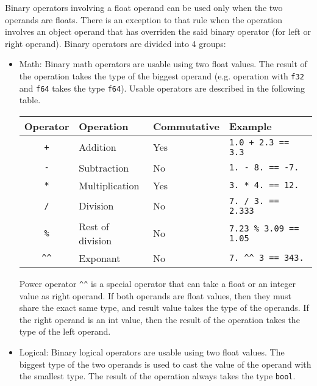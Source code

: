 Binary operators involving a float operand can be used only when the two
operands are floats. There is an exception to that rule when the operation
involves an object operand that has overriden the said binary operator (for left
or right operand). Binary operators are divided into 4 groups:
\begin{itemize}
\item Math: Binary math operators are usable using two float values. The result of the
  operation takes the type of the biggest operand (e.g. operation with \texttt{f32} and
  \texttt{f64} takes the type \texttt{f64}).  Usable operators are described in the
  following table.

  \begin{center}
    \vspace{-20pt}
    \begin{adjustbox}{max width=1.0\linewidth}
      \begin{tabular}{|c|lll|}
        \hline
        Operator & Operation & Commutative & Example\\[0pt]
        \hline
        \hline
        \texttt{+} & Addition & Yes & \texttt{1.0 + 2.3 == 3.3}\\[0pt]
        \texttt{-} & Subtraction & No & \texttt{1. - 8. == -7.}\\[0pt]
        \texttt{*} & Multiplication & Yes & \texttt{3. * 4. == 12.}\\[0pt]
        \texttt{/} & Division & No & \texttt{7. / 3. == 2.333}\\[0pt]
        \texttt{\%} & Rest of division & No & \texttt{7.23 \% 3.09 == 1.05}\\[0pt]
        \texttt{\textasciicircum{}\textasciicircum{}} & Exponant & No & \texttt{7. \textasciicircum{}\textasciicircum{} 3 == 343.}\\[0pt]
        \hline
      \end{tabular}
    \end{adjustbox}
  \end{center}

  Power operator \texttt{\textasciicircum{}\textasciicircum{}} is a special operator that can take a float or an integer
  value as right operand. If both operands are float values, then they must
  share the exact same type, and result value takes the type of the operands. If
  the right operand is an int value, then the result of the operation takes the
  type of the left operand.

\item Logical: Binary logical operators are usable using two float values. The biggest type
  of the two operands is used to cast the value of the operand with the smallest
  type. The result of the operation always takes the type \texttt{bool}.


\end{itemize}
